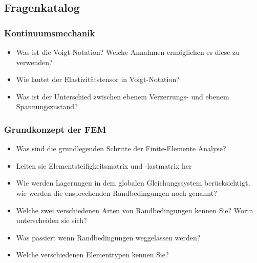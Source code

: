 

\clearpage
\subsection*{Fragenkatalog}

\subsubsection*{Kontinuumsmechanik}
\begin{itemize}
 \item Was ist die Voigt-Notation? Welche Annahmen ermöglichen es diese zu verwenden?
 \item Wie lautet der Elastizitätstensor in Voigt-Notation?
 \item Was ist der Unterschied zwischen ebenem Verzerrungs- und ebenem Spannungszustand?
\end{itemize}






\subsubsection*{Grundkonzept der FEM}
\begin{itemize}
 \item Was sind die grundlegenden Schritte der Finite-Elemente Analyse?
 \item Leiten sie Elementsteifigkeitsmatrix und -lastmatrix her
  \item Wie werden Lagerungen in dem globalen Gleichungssystem berücksichtigt, wie werden die ensprechenden Randbedingungen noch genannt?
  \item Welche zwei verschiedenen Arten von Randbedingungen kennen Sie? Worin unterscheiden sie sich?
  \item Was passiert wenn Randbedingungen weggelassen werden?
  \item Welche verschiedenen Elementtypen kennen Sie?
\end{itemize}



